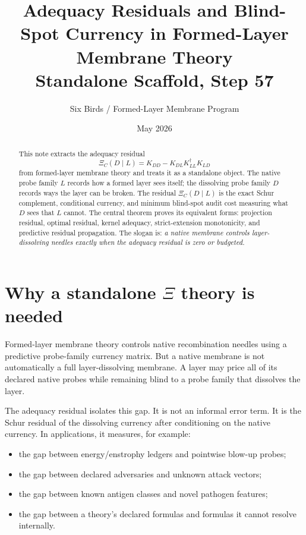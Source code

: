 \documentclass[11pt]{article}
\title{Adequacy Residuals and Blind-Spot Currency in Formed-Layer Membrane Theory\\
\large Standalone Scaffold, Step 57}
\author{Six Birds / Formed-Layer Membrane Program}
\date{May 2026}
\begin{document}
\maketitle

\begin{abstract}
This note extracts the adequacy residual
\[
\Xi_C(D\mid L)=K_{DD}-K_{DL}K_{LL}^{\dagger}K_{LD}
\]
from formed-layer membrane theory and treats it as a standalone object.  The native probe family
\(L\) records how a formed layer sees itself; the dissolving probe family \(D\) records ways the layer can be broken.  The residual \(\Xi_C(D\mid L)\) is the exact Schur complement, conditional currency, and minimum blind-spot audit cost measuring what \(D\) sees that \(L\) cannot.  The central theorem proves its equivalent forms: projection residual, optimal residual, kernel adequacy, strict-extension monotonicity, and predictive residual propagation.  The slogan is: \emph{a native membrane controls layer-dissolving needles exactly when the adequacy residual is zero or budgeted.}
\end{abstract}

\section{Why a standalone \texorpdfstring{$\Xi$}{Xi} theory is needed}

Formed-layer membrane theory controls native recombination needles using a predictive probe-family currency matrix.  But a native membrane is not automatically a full layer-dissolving membrane.  A layer may price all of its declared native probes while remaining blind to a probe family that dissolves the layer.

The adequacy residual isolates this gap.  It is not an informal error term.  It is the Schur residual of the dissolving currency after conditioning on the native currency.  In applications, it measures, for example:
\begin{itemize}[leftmargin=2em]
\item the gap between energy/enstrophy ledgers and pointwise blow-up probes;
\item the gap between declared adversaries and unknown attack vectors;
\item the gap between known antigen classes and novel pathogen features;
\item the gap between a theory's declared formulas and formulas it cannot resolve internally.
\end{itemize}
\end{document}
